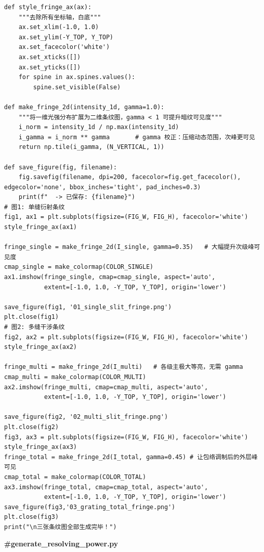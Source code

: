 \documentclass[12pt,a4paper]{ctexrep}
\begin{document}
\begin{lstlisting}[style=pycode]
def style_fringe_ax(ax):
    """去除所有坐标轴，白底"""
    ax.set_xlim(-1.0, 1.0)
    ax.set_ylim(-Y_TOP, Y_TOP)
    ax.set_facecolor('white')
    ax.set_xticks([])
    ax.set_yticks([])
    for spine in ax.spines.values():
        spine.set_visible(False)

def make_fringe_2d(intensity_1d, gamma=1.0):
    """将一维光强分布扩展为二维条纹图，gamma < 1 可提升暗纹可见度"""
    i_norm = intensity_1d / np.max(intensity_1d)
    i_gamma = i_norm ** gamma       # gamma 校正：压缩动态范围，次峰更可见
    return np.tile(i_gamma, (N_VERTICAL, 1))

def save_figure(fig, filename):
    fig.savefig(filename, dpi=200, facecolor=fig.get_facecolor(),                edgecolor='none', bbox_inches='tight', pad_inches=0.3)
    print(f"  -> 已保存: {filename}")
# 图1: 单缝衍射条纹
fig1, ax1 = plt.subplots(figsize=(FIG_W, FIG_H), facecolor='white')
style_fringe_ax(ax1)

fringe_single = make_fringe_2d(I_single, gamma=0.35)   # 大幅提升次级峰可见度
cmap_single = make_colormap(COLOR_SINGLE)
ax1.imshow(fringe_single, cmap=cmap_single, aspect='auto',
           extent=[-1.0, 1.0, -Y_TOP, Y_TOP], origin='lower')

save_figure(fig1, '01_single_slit_fringe.png')
plt.close(fig1)
# 图2: 多缝干涉条纹
fig2, ax2 = plt.subplots(figsize=(FIG_W, FIG_H), facecolor='white')
style_fringe_ax(ax2)

fringe_multi = make_fringe_2d(I_multi)   # 各级主极大等亮，无需 gamma
cmap_multi = make_colormap(COLOR_MULTI)
ax2.imshow(fringe_multi, cmap=cmap_multi, aspect='auto',
           extent=[-1.0, 1.0, -Y_TOP, Y_TOP], origin='lower')

save_figure(fig2, '02_multi_slit_fringe.png')
plt.close(fig2)
fig3, ax3 = plt.subplots(figsize=(FIG_W, FIG_H), facecolor='white')
style_fringe_ax(ax3)
fringe_total = make_fringe_2d(I_total, gamma=0.45) # 让包络调制后的外层峰可见
cmap_total = make_colormap(COLOR_TOTAL)
ax3.imshow(fringe_total, cmap=cmap_total, aspect='auto',
           extent=[-1.0, 1.0, -Y_TOP, Y_TOP], origin='lower')
save_figure(fig3,'03_grating_total_fringe.png')
plt.close(fig3)
print("\n三张条纹图全部生成完毕！")
\end{lstlisting}

\textbf{\#generate\_resolving\_power.py}
\end{document}
